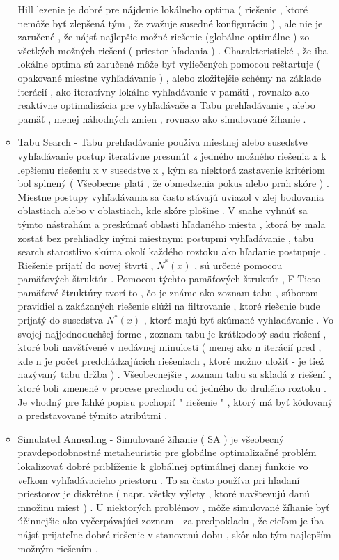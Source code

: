 \begin{itemize}
\begin{itemize}
Hill lezenie je dobré pre nájdenie lokálneho optima ( riešenie , ktoré nemôže byť zlepšená tým , že zvažuje susedné konfiguráciu ) , ale nie je zaručené , že nájsť najlepšie možné riešenie (globálne optimálne ) zo všetkých možných riešení ( priestor hľadania ) . Charakteristické , že iba lokálne optima sú zaručené môže byť vyliečených pomocou reštartuje ( opakované miestne vyhľadávanie ) , alebo zložitejšie schémy na základe iterácií , ako iteratívny lokálne vyhľadávanie v pamäti , rovnako ako reaktívne optimalizácia pre vyhľadávače a Tabu prehľadávanie , alebo pamäť , menej náhodných zmien , rovnako ako simulované žíhanie . \cite{algobook}




\item Tabu Search - Tabu prehľadávanie používa miestnej alebo susedstve vyhľadávanie postup iteratívne presunúť z jedného možného riešenia x k lepšiemu riešeniu x  v susedstve x , kým sa niektorá zastavenie kritériom bol splnený ( Všeobecne platí , že obmedzenia pokus alebo prah skóre ) . Miestne postupy vyhľadávania sa často stávajú uviazol v zlej bodovania oblastiach alebo v oblastiach, kde skóre plošine . V snahe vyhnúť sa týmto nástrahám a preskúmať oblasti hľadaného miesta , ktorá by mala zostať bez prehliadky inými miestnymi postupmi vyhľadávanie , tabu search starostlivo skúma okolí každého roztoku ako hľadanie postupuje . Riešenie prijatí do novej štvrti , $N ^ * ( x )$ , sú určené pomocou pamäťových štruktúr . Pomocou týchto pamäťových štruktúr , 
F
Tieto pamäťové štruktúry tvorí to , čo je známe ako zoznam tabu , súborom pravidiel a zakázaných riešenie slúži na filtrovanie , ktoré riešenie bude prijatý do susedstva $N ^ * ( x )$ , ktoré majú byť skúmané vyhľadávanie . Vo svojej najjednoduchšej forme , zoznam tabu je krátkodobý sadu riešení , ktoré boli navštívené v nedávnej minulosti ( menej ako n iterácií pred , kde n je počet predchádzajúcich riešeniach , ktoré možno uložiť - je tiež nazývaný tabu držba ) . Všeobecnejšie , zoznam tabu sa skladá z riešení , ktoré boli zmenené v procese prechodu od jedného do druhého roztoku . Je vhodný pre ľahké popisu pochopiť " riešenie " , ktorý má byť kódovaný a predstavované týmito atribútmi .

\item Simulated Annealing - Simulované žíhanie ( SA ) je všeobecný pravdepodobnostné metaheuristic pre globálne optimalizačné problém lokalizovať dobré priblíženie k globálnej optimálnej danej funkcie vo veľkom vyhľadávacieho priestoru . To sa často používa pri hľadaní priestorov je diskrétne ( napr. všetky výlety , ktoré navštevujú danú množinu miest ) . U niektorých problémov , môže simulované žíhanie byť účinnejšie ako vyčerpávajúci zoznam - za predpokladu , že cieľom je iba nájsť prijateľne dobré riešenie v stanovenú dobu , skôr ako tým najlepším možným riešením .


\end{itemize}
\end{itemize}
